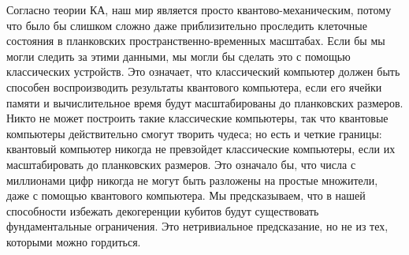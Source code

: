 \documentclass[main.tex]{subfiles}
\begin{document}
Согласно теории КА, наш мир является просто квантово-механическим, потому что было бы слишком сложно даже приблизительно проследить клеточные состояния в планковских пространственно-временных масштабах. Если бы мы могли следить за этими данными, мы могли бы сделать это с помощью классических устройств. Это означает, что классический компьютер должен быть способен воспроизводить результаты квантового компьютера, если его ячейки памяти и вычислительное время будут масштабированы до планковских размеров. Никто не может построить такие классические компьютеры, так что квантовые компьютеры действительно смогут творить чудеса; но есть и четкие границы: квантовый компьютер никогда не превзойдет классические компьютеры, если их масштабировать до планковских размеров. Это означало бы, что числа с миллионами цифр никогда не могут быть разложены на простые множители, даже с помощью квантового компьютера. Мы предсказываем, что в нашей способности избежать декогеренции кубитов будут существовать фундаментальные ограничения. Это нетривиальное предсказание, но не из тех, которыми можно гордиться.
\end{document}
